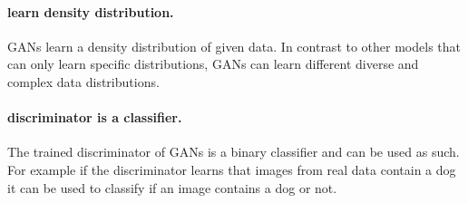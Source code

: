 \paragraph{learn density distribution.} GANs learn a density distribution of given data. In contrast to other models that can only learn specific distributions, GANs can learn different diverse and complex data distributions.

\paragraph{discriminator is a classifier.} The trained discriminator of GANs is a binary classifier and can be used as such. For example if the discriminator learns that images from real data contain a dog it can be used to classify if an image contains a dog or not. 